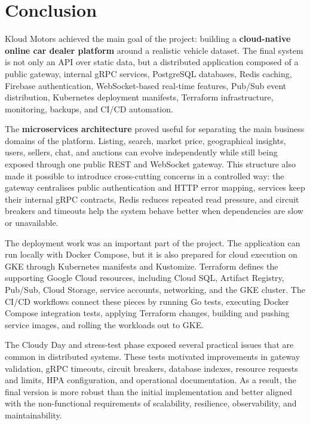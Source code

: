 \chapter{Conclusion} \label{cap:conclusion}

Kloud Motors achieved the main goal of the project: building a \textbf{cloud-native online car dealer platform} around a realistic vehicle dataset. The final system is not only an API over static data, but a distributed application composed of a public gateway, internal gRPC services, PostgreSQL databases, Redis caching, Firebase authentication, WebSocket-based real-time features, Pub/Sub event distribution, Kubernetes deployment manifests, Terraform infrastructure, monitoring, backups, and CI/CD automation.

The \textbf{microservices architecture} proved useful for separating the main business domains of the platform. Listing, search, market price, geographical insights, users, sellers, chat, and auctions can evolve independently while still being exposed through one public REST and WebSocket gateway. This structure also made it possible to introduce cross-cutting concerns in a controlled way: the gateway centralises public authentication and HTTP error mapping, services keep their internal gRPC contracts, Redis reduces repeated read pressure, and circuit breakers and timeouts help the system behave better when dependencies are slow or unavailable.

The deployment work was an important part of the project. The application can run locally with Docker Compose, but it is also prepared for cloud execution on GKE through Kubernetes manifests and Kustomize. Terraform defines the supporting Google Cloud resources, including Cloud SQL, Artifact Registry, Pub/Sub, Cloud Storage, service accounts, networking, and the GKE cluster. The CI/CD workflows connect these pieces by running Go tests, executing Docker Compose integration tests, applying Terraform changes, building and pushing service images, and rolling the workloads out to GKE.

The Cloudy Day and stress-test phase exposed several practical issues that are common in distributed systems. These tests motivated improvements in gateway validation, gRPC timeouts, circuit breakers, database indexes, resource requests and limits, HPA configuration, and operational documentation. As a result, the final version is more robust than the initial implementation and better aligned with the non-functional requirements of scalability, resilience, observability, and maintainability.

